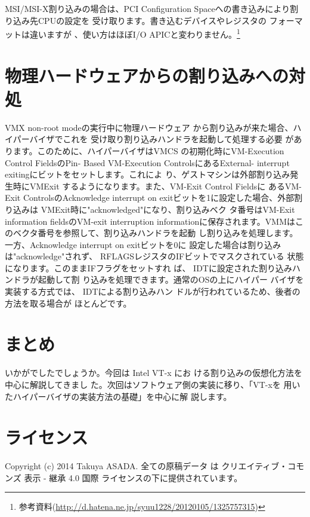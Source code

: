  MSI/MSI-X割り込みの場合は、PCI Configuration
Spaceへの書き込みにより割り込み先CPUの設定を
受け取ります。書き込むデバイスやレジスタの
フォーマットは違いますが 、使い方はほぼI/O
APICと変わりません。\footnote{
参考資料(\href{http://d.hatena.ne.jp/syuu1228/20120105/1325757315}{http://d.hatena.ne.jp/syuu1228/20120105/1325757315})
}　　 


\section{物理ハードウェアからの割り込みへの対処}

 VMX non-root modeの実行中に物理ハードウェア
から割り込みが来た場合、ハイパーバイザでこれを
受け取り割り込みハンドラを起動して処理する必要
があります。このために、ハイパーバイザはVMCS
の初期化時にVM-Execution Control FieldsのPin-
Based VM-Execution ControlsにあるExternal-
interrupt exitingにビットをセットします。これによ
り、ゲストマシンは外部割り込み発生時にVMExit
するようになります。また、VM-Exit Control Fieldsに
あるVM-Exit ControlsのAcknowledge interrupt on
exitビットを1に設定した場合、外部割り込みは
VMExit時に"acknowledged"になり、割り込みベク
タ番号はVM-Exit information fieldsのVM-exit
interruption informationに保存されます。VMMはこ
のベクタ番号を参照して、割り込みハンドラを起動
し割り込みを処理します。
 一方、Acknowledge interrupt on exitビットを0に
設定した場合は割り込みは"acknowledge"されず、
RFLAGSレジスタのIFビットでマスクされている
状態になります。このままIFフラグをセットすれ
ば、 IDTに設定された割り込みハンドラが起動して割
り込みを処理できます。通常のOSの上にハイパー
バイザを実装する方式では、 IDTによる割り込みハン
ドルが行われているため、後者の方法を取る場合が
ほとんどです。


\section{まとめ}

 いかがでしたでしょうか。今回は Intel VT-x にお
ける割り込みの仮想化方法を中心に解説してきまし
た。次回はソフトウェア側の実装に移り、「VT-xを
用いたハイパーバイザの実装方法の基礎」を中心に解
説します。
\section{ライセンス}
Copyright (c) 2014 Takuya ASADA.
全ての原稿データ は クリエイティブ・コモンズ 表示 - 継承 4.0 国際 ライセンスの下に提供されています。



